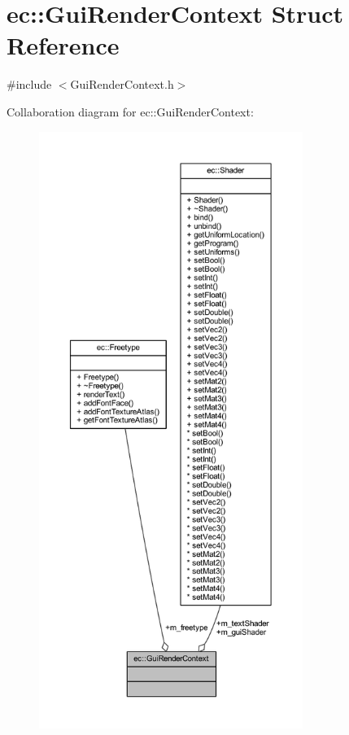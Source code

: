 \hypertarget{structec_1_1_gui_render_context}{}\section{ec\+:\+:Gui\+Render\+Context Struct Reference}
\label{structec_1_1_gui_render_context}


{\ttfamily \#include $<$Gui\+Render\+Context.\+h$>$}



Collaboration diagram for ec\+:\+:Gui\+Render\+Context\+:\nopagebreak
\begin{figure}[H]
\begin{center}
\leavevmode
\includegraphics[height=550pt]{structec_1_1_gui_render_context__coll__graph}
\end{center}
\end{figure}
